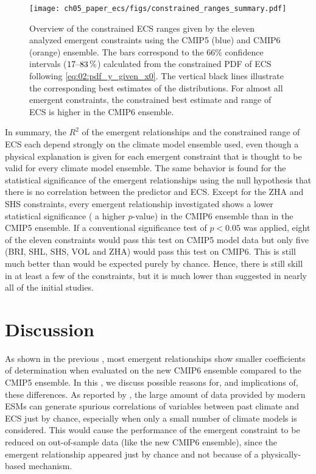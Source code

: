 \begin{figure}[t]
  \centering
  \texttt{[image: 
    ch05\_paper\_ecs/figs/constrained\_ranges\_summary.pdf]}
  \caption{Overview of the constrained \acf{ECS} ranges given by the eleven
    analyzed emergent constraints using the \acs{CMIP}5 (blue) and \acs{CMIP}6
    (orange) ensemble. The bars correspond to the $66 \unit{\%}$ confidence
    intervals ($\rangeunit{17}{83}{\%}$) calculated from the constrained
    \acl{PDF} of \acs{ECS} following \cref{eq:02:pdf_y_given_x0}. The vertical
    black lines illustrate the corresponding best estimates of the
    distributions. For almost all emergent constraints, the constrained best
    estimate and range of \ac{ECS} is higher in the \acs{CMIP}6 ensemble.}
  \label{fig:05:overview_results}
\end{figure}

In summary, the $R^2$ of the emergent relationships and the constrained range
of \ac{ECS} each depend strongly on the climate model ensemble used, even
though a physical explanation is given for each emergent constraint that is
thought to be valid for every climate model ensemble. The same behavior is
found for the statistical significance of the emergent relationships using the
null hypothesis that there is no correlation between the predictor and
\ac{ECS}. Except for the ZHA and SHS constraints, every emergent relationship
investigated shows a lower statistical significance (\ie{} a higher $p$-value)
in the \acs{CMIP}6 ensemble than in the \acs{CMIP}5 ensemble. If a conventional
significance test of $p < 0.05$ was applied, eight of the eleven constraints
would pass this test on \acs{CMIP}5 model data but only five (BRI, SHL, SHS,
VOL and ZHA) would pass this test on \acs{CMIP}6. This is still much better
than would be expected purely by chance. Hence, there is still skill in at
least a few of the constraints, but it is much lower than suggested in nearly
all of the initial studies.


\section{Discussion}
\label{sec:05:discussion}

As shown in the previous ,
most emergent relationships show smaller coefficients of determination when
evaluated on the new \acs{CMIP}6 ensemble compared to the \acs{CMIP}5 ensemble.
In this , we discuss possible reasons for, and
implications of, these differences. As reported by \textcite{Caldwell2014}, the
large amount of data provided by modern \acp{ESM} can generate spurious
correlations of variables between past climate and \ac{ECS} just by chance,
especially when only a small number of climate models is considered. This would
cause the performance of the emergent constraint to be reduced on out-of-sample
data (like the new \acs{CMIP}6 ensemble), since the emergent relationship
appeared just by chance and not because of a physically-based mechanism.

